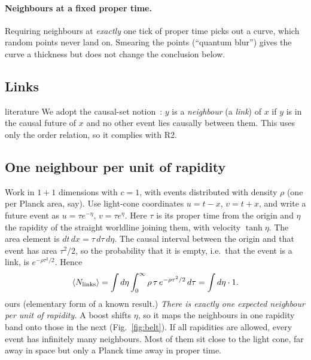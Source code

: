 \documentclass[11pt,a4paper]{article}
\newcommand{\tagbox}[2]{\textsf{\scriptsize\colorbox{#1!12}{\textcolor{#1!70!black}{#2}}}}
\newcommand{\lit}{\tagbox{blue}{literature}}
\newcommand{\ours}{\tagbox{orange}{ours}}
\begin{document}
\paragraph{Neighbours at a fixed proper time.} Requiring neighbours at \emph{exactly} one tick of proper time picks out a curve, which random points never land on. Smearing the points (``quantum blur'') gives the curve a thickness but does not change the conclusion below.

\subsection{Links}
\lit{} We adopt the causal-set notion~\cite{BLMS87,Surya19}: $y$ is a \emph{neighbour} (a \emph{link}) of $x$ if $y$ is in the causal future of $x$ and no other event lies causally between them. This uses only the order relation, so it complies with R2.

\subsection{One neighbour per unit of rapidity}
Work in $1+1$ dimensions with $c=1$, with events distributed with density $\rho$ (one per Planck area, say). Use light-cone coordinates $u=t-x$, $v=t+x$, and write a future event as $u=\tau e^{-\eta}$, $v=\tau e^{\eta}$. Here $\tau$ is its proper time from the origin and $\eta$ the rapidity of the straight worldline joining them, with velocity $\tanh\eta$. The area element is $dt\,dx=\tau\,d\tau\,d\eta$. The causal interval between the origin and that event has area $\tau^2/2$, so the probability that it is empty, i.e.\ that the event is a link, is $e^{-\rho\tau^2/2}$. Hence
\begin{equation}
\langle N_{\rm links}\rangle=\int d\eta\int_0^\infty \rho\,\tau\,e^{-\rho\tau^2/2}\,d\tau=\int d\eta\cdot 1 .
\label{eq:onepereta}
\end{equation}
\ours{} (elementary form of a known result.) \emph{There is exactly one expected neighbour per unit of rapidity.} A boost shifts $\eta$, so it maps the neighbours in one rapidity band onto those in the next (Fig.~\ref{fig:belt}). If all rapidities are allowed, every event has infinitely many neighbours. Most of them sit close to the light cone, far away in space but only a Planck time away in proper time.
\end{document}
